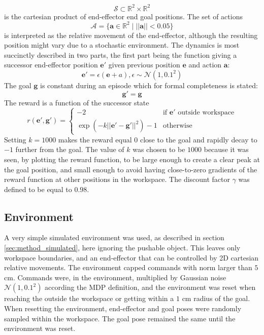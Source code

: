 \begin{equation}
    \mathcal{S} \subset \mathbb{R}^2 \times \mathbb{R}^2
\end{equation}
is the cartesian product of end-effector end goal positions. The set of actions
\begin{equation}
    \mathcal{A} = \lbrace \mathbf{a} \in \mathbb{R}^2 \mid ||\mathbf{a}|| < 0.05 \rbrace
\end{equation}
is interpreted as the relative movement of the end-effector, although the
resulting position might vary due to a stochastic environment. The dynamics is
most succinctly described in two parts, the first part being the function
giving a successor end-effector position $\mathbf{e}'$ given previous position
$\mathbf{e}$ and action $\mathbf{a}$:
\begin{equation}
    \mathbf{e}' = \epsilon(\mathbf{e} + a), \epsilon \sim \mathcal{N}(1, 0.1^2)
\end{equation}
The goal $\mathbf{g}$ is constant during an episode which for formal
completeness is stated:
\begin{equation}
    \mathbf{g}' = \mathbf{g}
\end{equation}
The reward is a function of the successor state
\begin{equation}
    r(\mathbf{e', g'}) =
    \begin{cases}
        -2 &\text{if } \mathbf{e'} \text{ outside workspace}\\
        \exp\left(-k||\mathbf{e'} - \mathbf{g'}||^2\right) - 1 &\text{otherwise}
    \end{cases}
\end{equation}
Setting $k = 1000$ makes the reward equal $0$ close to the goal and rapidly
decay to $-1$ further from the goal. The value of $k$ was chosen to be $1000$
because it was seen, by plotting the reward function, to be large enough to
create a clear peak at the goal position, and small enough to avoid having
close-to-zero gradients of the reward function at other positions in the
workspace.
The discount factor $\gamma$ was defined to be equal to $0.98$.

\subsection{Environment}

A very simple simulated environment was used, as described in section
\ref{sec:method_simulated}, here ignoring the pushable object. This leaves only
workspace boundaries, and an end-effector that can be controlled by 2D
cartesian relative movements. The environment capped commands with norm larger
than $5$ cm. Commands were, in the environment, multiplied by Gaussian noise
$\mathcal{N}(1, 0.1^2)$ according the MDP definition, and the environment was
reset when reaching the outside the workspace or getting within a $1$ cm radius
of the goal. When resetting the environment, end-effector and goal poses were
randomly sampled within the workspace. The goal pose remained the same until
the environment was reset.

